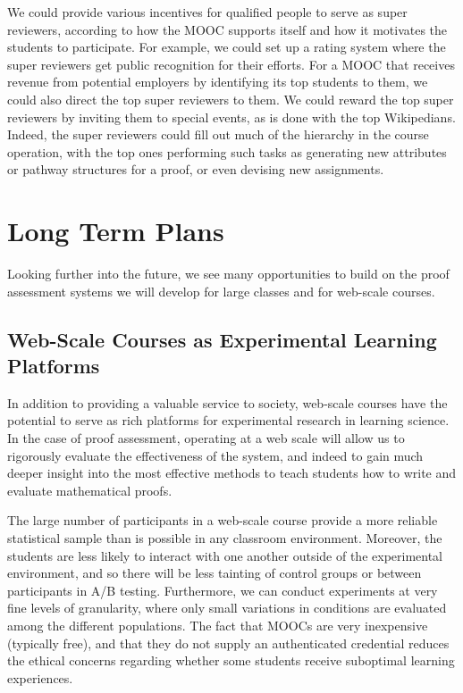 \documentclass[12pt]{article}
\begin{document}
We could provide various incentives for qualified people to serve as
super reviewers, according to how the MOOC supports itself and how it
motivates the students to participate.  For example, we could set up a
rating system where the super reviewers get public recognition for
their efforts.  For a MOOC that receives revenue from potential
employers by identifying its top students to them, we could also
direct the top super reviewers to them.  We could reward the top super
reviewers by inviting them to special events, as is done with the top
Wikipedians.  Indeed, the super reviewers could fill out much of the
hierarchy in the course operation, with the top ones performing such
tasks as generating new attributes or pathway structures for a proof,
or even devising new assignments.

\section{Long Term Plans}

Looking further into the future, we see many opportunities to build on
the proof assessment systems we will develop for large classes and for
web-scale courses.

\subsection{Web-Scale Courses as Experimental Learning Platforms}

In addition to providing a valuable service to society, web-scale
courses have the potential to serve as rich platforms for experimental
research in learning science.  In the case of proof assessment,
operating at a web scale will allow us to rigorously evaluate the
effectiveness of the system, and indeed to gain much deeper insight
into the most effective methods to teach students how to write and
evaluate mathematical proofs.

The large number of participants in a web-scale course provide a more
reliable statistical sample than is possible in any classroom
environment.  Moreover, the students are less likely to interact with
one another outside of the experimental environment, and so there will
be less tainting of control groups or between participants in A/B
testing.  Furthermore, we can conduct experiments at very fine levels
of granularity, where only small variations in conditions are
evaluated among the different populations.  The fact that MOOCs are
very inexpensive (typically free), and that they do not supply an
authenticated credential reduces the ethical concerns regarding whether
some students receive suboptimal learning experiences.
\end{document}
